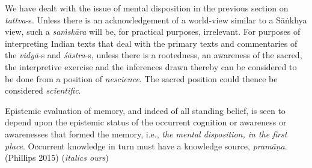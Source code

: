 We have dealt with the issue of mental disposition in the previous section on {\sl tattva}-s. Unless there is an acknowledgement of a world-view similar to a Sāṅkhya view, such a {\sl saṁskāra} will be, for practical purposes, irrelevant. For purposes of interpreting Indian texts that deal with the primary texts and commentaries of the {\sl vidyā}-s and {\sl śāstra}-s, unless there is a rootedness, an awareness of the sacred, the interpretive exercise and the inferences drawn thereby can be considered to be done from a position of {\sl nescience}. The sacred position could thence be considered {\sl scientific}.
\begin{myquote}
Epistemic evaluation of memory, and indeed of all standing belief, is seen to depend upon the epistemic status of the occurrent cognition or awareness or awarenesses that formed the memory, i.e., {\sl the mental disposition, in the first place}. Occurrent knowledge in turn must have a knowledge source, {\sl pramāṇa}.\hfill (Phillips 2015) ({\sl italics ours})
\end{myquote}

